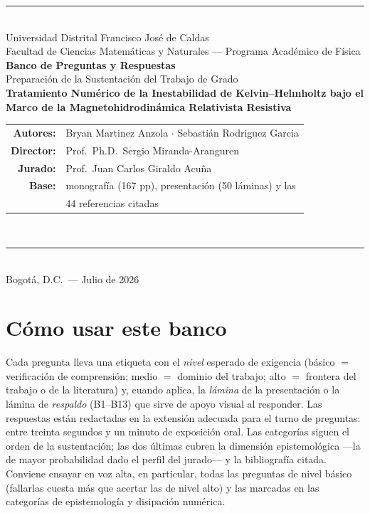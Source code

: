\documentclass[11pt,letterpaper]{article}
\newcounter{preg}
\begin{document}
\begin{titlepage}
\centering
\vspace*{1.2cm}
{\color{primary}\rule{\linewidth}{2pt}}\\[0.9cm]
{\large Universidad Distrital Francisco José de Caldas}\\[2pt]
{\small Facultad de Ciencias Matemáticas y Naturales --- Programa Académico de Física}\\[1.6cm]
{\LARGE\bfseries Banco de Preguntas y Respuestas}\\[0.5cm]
{\large Preparación de la Sustentación del Trabajo de Grado}\\[0.9cm]
{\color{primary}\Large\bfseries Tratamiento Numérico de la Inestabilidad de
Kelvin--Helmholtz bajo el Marco de la Magnetohidrodinámica Relativista
Resistiva}\\[1.4cm]
\begin{tabular}{rl}
\textbf{Autores:}  & Bryan Martinez Anzola \;$\cdot$\; Sebastián Rodriguez Garcia\\[4pt]
\textbf{Director:} & Prof.\ Ph.D.\ Sergio Miranda-Aranguren\\[4pt]
\textbf{Jurado:}   & Prof.\ Juan Carlos Giraldo Acuña\\[4pt]
\textbf{Base:}     & monografía (167 pp), presentación (50 láminas) y las\\
                   & 44 referencias citadas\\
\end{tabular}\\[1.5cm]
{\color{primary}\rule{\linewidth}{2pt}}\\[0.8cm]
{\small Bogotá, D.C.\ --- Julio de 2026}
\vfill
\end{titlepage}

\tableofcontents
\newpage

\section*{Cómo usar este banco}
Cada pregunta lleva una etiqueta con el \emph{nivel} esperado de exigencia
(básico $=$ verificación de comprensión; medio $=$ dominio del trabajo;
alto $=$ frontera del trabajo o de la literatura) y, cuando aplica, la
\emph{lámina} de la presentación o la lámina de \emph{respaldo} (B1--B13)
que sirve de apoyo visual al responder. Las respuestas están redactadas en
la extensión adecuada para el turno de preguntas: entre treinta segundos y
un minuto de exposición oral. Las categorías siguen el orden de la
sustentación; las dos últimas cubren la dimensión epistemológica ---la de
mayor probabilidad dado el perfil del jurado--- y la bibliografía citada.
Conviene ensayar en voz alta, en particular, todas las preguntas de nivel
básico (fallarlas cuesta más que acertar las de nivel alto) y las marcadas
en las categorías de epistemología y disipación numérica.




\end{document}
